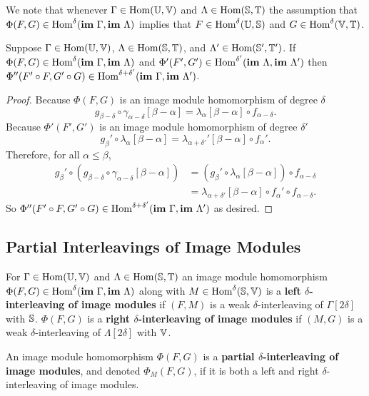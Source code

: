 We note that whenever $\Gamma\in\Hom(\U,\V)$ and $\Lambda\in\Hom(\S,\T)$ the assumption that $\Phi(F, G)\in\Hom^\delta(\im~\Gamma, \im~\Lambda)$ implies that $F\in\Hom^\delta(\U,\S)$ and $G\in\Hom^\delta(\V,\T)$.

\begin{lemma}\label{lem:image_composition}
  Suppose $\Gamma\in\Hom(\U,\V)$, $\Lambda\in\Hom(\S,\T)$, and $\Lambda'\in\Hom(\S',\T')$.
  If $\Phi(F, G)\in\Hom^\delta(\im~\Gamma, \im~\Lambda)$ and $\Phi'(F', G')\in\Hom^{\delta'}(\im~\Lambda, \im~\Lambda')$ then $\Phi''(F'\circ F, G'\circ G)\in\Hom^{\delta+\delta'}(\im~\Gamma,\im~\Lambda')$.
\end{lemma}
\begin{proof}
  Because $\Phi(F, G)$ is an image module homomorphism of degree $\delta$
  \[ g_{\beta-\delta}\circ\gamma_{\alpha-\delta}[\beta-\alpha] = \lambda_\alpha[\beta-\alpha]\circ f_{\alpha-\delta}.\]
  Because $\Phi'(F', G')$ is an image module homomorphism of degree $\delta'$
  \[ g_{\beta}'\circ\lambda_{\alpha}[\beta-\alpha] = \lambda_{\alpha +\delta'}'[\beta-\alpha]\circ f_{\alpha}'.\]
  Therefore, for all $\alpha\leq\beta$,
  \begin{align*}
    g_\beta'\circ (g_{\beta-\delta}\circ \gamma_{\alpha-\delta}[\beta-\alpha]) &= (g_\beta'\circ \lambda_\alpha[\beta-\alpha])\circ f_{\alpha-\delta}\\
      &=\lambda_{\alpha+\delta'}[\beta-\alpha]\circ f_\alpha'\circ f_{\alpha-\delta}.
  \end{align*}
  So $\Phi''(F'\circ F, G'\circ G)\in\Hom^{\delta+\delta'}(\im~\Gamma,\im~\Lambda')$ as desired.

\end{proof}

\subsection{Partial Interleavings of Image Modules}

\begin{definition}
  For $\Gamma\in\Hom(\U,\V)$ and $\Lambda\in\Hom(\S,\T)$ an image module homomorphism $\Phi(F, G)\in\Hom^\delta(\im~\Gamma,\im~\Lambda)$ along with $M\in\Hom^\delta(\S,\V)$ is a \textbf{left $\delta$-interleaving of image modules} if $(F, M)$ is a weak $\delta$-interleaving of $\Gamma[2\delta]$ with $\S$.
  $\Phi(F, G)$ is a \textbf{right $\delta$-interleaving of image modules} if $(M, G)$ is a weak $\delta$-interleaving of $\Lambda[2\delta]$ with $\V$.

  An image module homomorphism $\Phi(F, G)$ is a \textbf{partial $\delta$-interleaving of image modules}, and denoted $\Phi_M(F, G)$, if it is both a left and right $\delta$-interleaving of image modules.
\end{definition}

